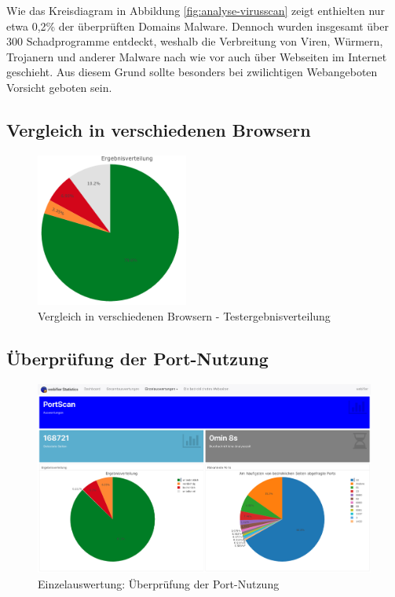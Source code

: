 Wie das Kreisdiagram in Abbildung \ref{fig:analyse-virusscan} zeigt enthielten nur etwa 0,2\% der überprüften Domains Malware. Dennoch wurden insgesamt über 300 Schadprogramme entdeckt, weshalb die Verbreitung von Viren, Würmern, Trojanern und anderer Malware nach wie vor auch über Webseiten im Internet geschieht. Aus diesem Grund sollte besonders bei zwilichtigen Webangeboten Vorsicht geboten sein.

\subsection{Vergleich in verschiedenen Browsern}
\begin{figure}[H]
  \centering
  \includegraphics[width=5cm]{images/stats/diaheaderinspection}
  \caption{Vergleich in verschiedenen Browsern - Testergebnisverteilung}
  \label{fig:analyse-diaheaderinspection}
\end{figure}

\subsection{Überprüfung der Port-Nutzung}

\begin{figure}[H]
  \centering
  \includegraphics[width=15cm]{images/stats/portscan}
  \caption[Einzelauswertung: Überprüfung der Port-Nutzung]{Einzelauswertung: Überprüfung der Port-Nutzung\protect\footnotemark}
  \label{fig:analyse-portscan}
\end{figure}

